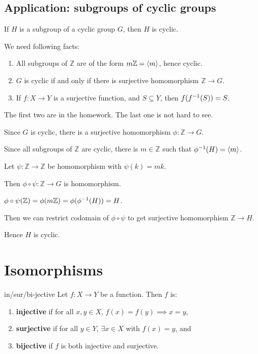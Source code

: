\subsection{Application: subgroups of cyclic groups}
\begin{prop}
If $H$ is a subgroup of a cyclic group $G$, then $H$ is cyclic.
\end{prop}

\begin{pf}
We need following facts:
\begin{enumerate}
\item All subgroups of $\mathbb Z$ are of the form $m\mathbb Z=\left\langle m \right\rangle$, hence cyclic.
\item $G$ is cyclic if and only if there is surjective homomorphism $\mathbb Z\to G$.
\item If $f:X\to Y$ is a surjective function, and $S\subseteq Y$, then $f(f^{-1}(S))=S$.
\end{enumerate}
The first two are in the homework. The last one is not hard to see.

Since $G$ is cyclic, there is a surjective homomorphism $\phi:\mathbb Z\to G$.

Since all subgroups of $\mathbb Z$ are cyclic, there is $m\in \mathbb Z$ such that $\phi^{-1}(H)=\left\langle m \right\rangle$.

Let $\psi: \mathbb Z\to \mathbb Z$ be homomorphism with $\psi(k)=mk$.

Then $\phi\circ \psi: \mathbb Z\to G$ is homomorphism.

$\phi\circ \psi(\mathbb Z)= \phi(m\mathbb Z)=\phi(\phi^{-1} (H))=H$.

Then we can restrict codomain of $\phi\circ \psi$ to get surjective homomorphism $\mathbb Z\to H$.

Hence $H$ is cyclic.
\end{pf}

\section{Isomorphisms}
\begin{defn}{in/sur/bi-jective}
Let $f:X\to Y$ be a function. Then $f$ is:
\begin{enumerate}
\item \textbf{injective} if for all $x,y\in X$, $f(x)=f(y)\implies x=y$,
\item \textbf{surjective} if for all $y\in Y$, $\exists x\in X$ with $f(x)=y$, and
\item \textbf{bijective} if $f$ is both injective and surjective.
\end{enumerate}
\end{defn}

